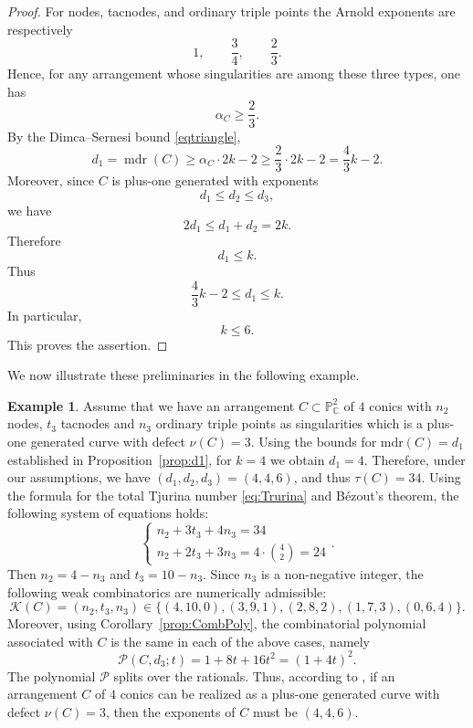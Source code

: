 \documentclass[11pt]{article}
\theoremstyle{plain}
\theoremstyle{definition}
\newtheorem{remark}[thm]{Remark}
\newtheorem{example}[thm]{Example}
\let\oldeqref\eqref
\renewcommand{\eqref}[1]{\begingroup\hypersetup{linkcolor=black}\oldeqref{#1}\endgroup}
\begin{document}
\begin{proof}
For nodes, tacnodes, and ordinary triple points the Arnold exponents are respectively
\[
1,\qquad \frac34,\qquad \frac23.
\]
Hence, for any arrangement whose singularities are among these three types, one has
\[
\alpha_C\geq \frac23.
\]
By the Dimca--Sernesi bound \eqref{eqtriangle},
\[
d_1=\operatorname{mdr}(C)\geq \alpha_C\cdot 2k-2
\geq \frac23\cdot 2k-2
=
\frac43k-2.
\]
Moreover, since \(C\) is plus-one generated with exponents
\[
d_1\leq d_2\leq d_3,
\]
we have
\[
2d_1\leq d_1+d_2=2k.
\]
Therefore
\[
d_1\leq k.
\]
Thus
\[
\frac43k-2\leq d_1\leq k.
\]
In particular,
\[
k\leq 6.
\]
This proves the assertion.
\end{proof}



We now illustrate these preliminaries in the following example.
\begin{example} \label{ex:4k}
    Assume that we have an arrangement $C\subset\mathbb{P}^2_\mathbb{C}$ of $4$ conics with $n_2$ nodes, $t_3$ tacnodes and $n_3$ ordinary triple points as singularities which is a plus-one generated curve with defect $\nu(C)=3$.
Using the bounds for $\text{mdr}(C)=d_1$ established in Proposition~\ref{prop:d1}, for $k=4$ we obtain $d_1=4$. 
    Therefore, under our assumptions, we have $(d_1,d_2,d_3)=(4,4,6)$, and thus $\tau(C)=34$. 
    Using the formula for the total Tjurina number \eqref{eq:Trurina} and B\'ezout's theorem, the following system of equations holds:
    $$\begin{cases}
n_2+3t_3+4n_3=34 \\
n_2+2t_3+3n_3=4\cdot\binom{4}{2}=24
\end{cases}.$$
 Then $n_2=4-n_3$ and $t_3=10-n_3$. Since $n_3$ is a non-negative integer, the following weak combinatorics are numerically admissible:
    $$\mathcal{K}(C)=(n_2,t_3,n_3)\in\{(4,10,0),(3,9,1),(2,8,2),(1,7,3),(0,6,4)\}.$$
    Moreover, using Corollary~\ref{prop:CombPoly}, the combinatorial polynomial associated with $C$ is the same in each of the above cases, namely
$$\mathcal{P}(C,d_3;t)=1+8t+16t^2=(1+4t)^2.$$
The polynomial $\mathcal{P}$ splits over the rationals. Thus, according to \cite[Theorem 3.2]{BJP}, if an arrangement $C$ of $4$ conics can be realized as a plus-one generated curve with defect $\nu(C)=3$, then the exponents of $C$ must be $(4,4,6)$. 
\end{example}
\end{document}
